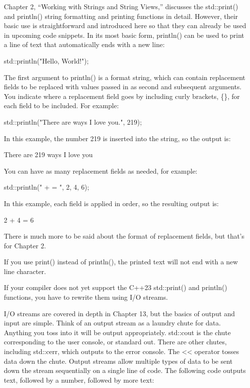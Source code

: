 Chapter 2, “Working with Strings and String Views,” discusses the std::print() and println() string formatting and printing functions in detail. However, their basic use is straightforward and introduced here so that they can already be used in upcoming code snippets. In its most basic form, println() can be used to print a line of text that automatically ends with a new line:

\begin{cpp}
std::println("Hello, World!");
\end{cpp}

The first argument to println() is a format string, which can contain replacement fields to be replaced with values passed in as second and subsequent arguments. You indicate where a replacement field goes by including curly brackets, \{\}, for each field to be included. For example:

\begin{cpp}
std::println("There are {} ways I love you.", 219);
\end{cpp}

In this example, the number 219 is inserted into the string, so the output is:

\begin{shell}
There are 219 ways I love you
\end{shell}

You can have as many replacement fields as needed, for example:

\begin{cpp}
std::println("{} + {} = {}", 2, 4, 6);
\end{cpp}

In this example, each field is applied in order, so the resulting output is:

\begin{shell}
2 + 4 = 6
\end{shell}

There is much more to be said about the format of replacement fields, but that’s for Chapter 2.

If you use print() instead of println(), the printed text will not end with a new line character.


If your compiler does not yet support the C++23 std::print() and println() functions, you have to rewrite them using I/O streams.

I/O streams are covered in depth in Chapter 13, but the basics of output and input are simple. Think of an output stream as a laundry chute for data. Anything you toss into it will be output appropriately. std::cout is the chute corresponding to the user console, or standard out. There are other chutes, including std::cerr, which outputs to the error console. The <{}< operator tosses data down the chute. Output streams allow multiple types of data to be sent down the stream sequentially on a single line of code. The following code outputs text, followed by a number, followed by more text:

